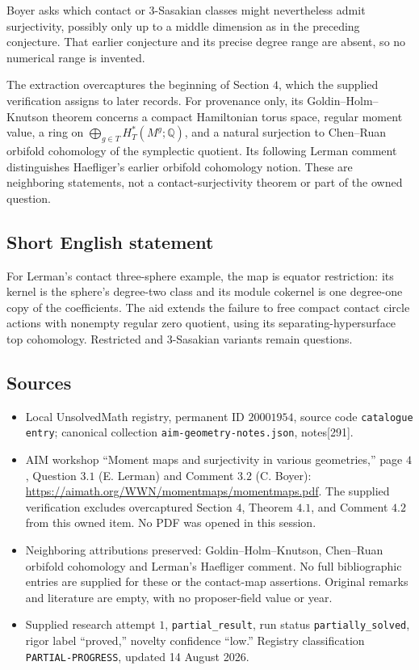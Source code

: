 \documentclass[11pt]{article}
\newcommand{\Q}{\mathbb{Q}}
\begin{document}
Boyer asks which contact or \(3\)-Sasakian classes might nevertheless admit surjectivity, possibly only up to a middle dimension as in the preceding conjecture. That earlier conjecture and its precise degree range are absent, so no numerical range is invented.

The extraction overcaptures the beginning of Section \(4\), which the supplied verification assigns to later records. For provenance only, its Goldin--Holm--Knutson theorem concerns a compact Hamiltonian torus space, regular moment value, a ring on \(\bigoplus_{g\in T}H_T^*(M^g;\Q)\), and a natural surjection to Chen--Ruan orbifold cohomology of the symplectic quotient. Its following Lerman comment distinguishes Haefliger's earlier orbifold cohomology notion. These are neighboring statements, not a contact-surjectivity theorem or part of the owned question.
\subsection{Short English statement}
For Lerman's contact three-sphere example, the map is equator restriction: its kernel is the sphere's degree-two class and its module cokernel is one degree-one copy of the coefficients. The aid extends the failure to free compact contact circle actions with nonempty regular zero quotient, using its separating-hypersurface top cohomology. Restricted and \(3\)-Sasakian variants remain questions.
\subsection{Sources}
\begin{itemize}
\item Local UnsolvedMath registry, permanent ID \(20001954\), source code \texttt{catalogue entry}; canonical collection \texttt{aim-geometry-notes.json}, notes[291].
\item AIM workshop ``Moment maps and surjectivity in various geometries,'' page \(4\), Question \(3.1\) (E. Lerman) and Comment \(3.2\) (C. Boyer): \url{https://aimath.org/WWN/momentmaps/momentmaps.pdf}. The supplied verification excludes overcaptured Section \(4\), Theorem \(4.1\), and Comment \(4.2\) from this owned item. No PDF was opened in this session.
\item Neighboring attributions preserved: Goldin--Holm--Knutson, Chen--Ruan orbifold cohomology and Lerman's Haefliger comment. No full bibliographic entries are supplied for these or the contact-map assertions. Original remarks and literature are empty, with no proposer-field value or year.
\item Supplied research attempt \(1\), \texttt{partial\_result}, run status \texttt{partially\_solved}, rigor label ``proved,'' novelty confidence ``low.'' Registry classification \texttt{PARTIAL-PROGRESS}, updated 14 August 2026.
\end{itemize}
\end{document}
